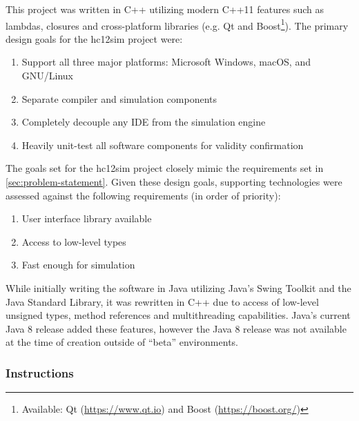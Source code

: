 This project was written in C++ utilizing modern C++11 features such as lambdas, closures and cross-platform libraries (e.g. Qt and Boost\footnote{Available: Qt (\url{https://www.qt.io}) and Boost (\url{https://boost.org/})}). The primary design goals for the hc12sim project were:
\begin{enumerate}
    \item Support all three major platforms: Microsoft Windows, macOS, and GNU/Linux
    \item Separate compiler and simulation components
    \item Completely decouple any IDE from the simulation engine
    \item Heavily unit-test all software components for validity confirmation
\end{enumerate}
\noindent The goals set for the hc12sim project closely mimic the requirements set in \cref{sec:problem-statement}.
Given these design goals, supporting technologies were assessed against the following requirements (in order of priority): 
\begin{enumerate}
    \item User interface library available
    \item Access to low-level types
    \item Fast enough for simulation
\end{enumerate}

While initially writing the software in Java utilizing Java's Swing Toolkit and the Java Standard Library, it was rewritten in C++ due to access of low-level unsigned types, method references and multithreading capabilities. Java's current Java 8 release added these features, however the Java 8 release was not available at the time of creation outside of ``beta'' environments.

\subsubsection{Instructions}
\label{sec:hc12sim:instruction-generation}

